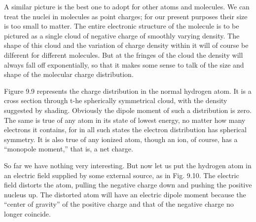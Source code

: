 A similar picture is the best one to adopt for other atoms and 
molecules. We can treat the nuclei in molecules as point charges; for our
present purposes their size is too small to matter. The entire electronic
structure of the molecule is to be pictured as a single cloud of
negative charge of smoothly varying density. The shape of this cloud
and the variation of charge density within it will of course be dilferent
for different molecules. But at the fringes of the cloud the density
will always fall off exponentially, so that it makes some sense to talk
of the size and shape of the molecular charge distribution.

Figure 9.9 represents the charge distribution in the normal hydrogen
atom. It is a cross section through t-he spherically symmetrical
cloud, with the density suggested by shading. Obviously the dipole
moment of such a distribution is zero. The same is true of any atom
in its state of lowest energy, no matter how many electrons it 
contains, for in all such states the electron distribution has spherical
symmetry. It is also true of any ionized atom, though an ion, of
course, has a ``monopole moment,'' that is, a net charge.

So far we have nothing very interesting. But now let us put the
hydrogen atom in an electric field supplied by some external source,
as in Fig. 9.10. The electric field distorts the atom, pulling the negative
charge down and pushing the positive nucleus up. The distorted
atom will have an electric dipole moment because the ``center of
gravity'' of the positive charge and that of the negative charge no
longer coincide.

